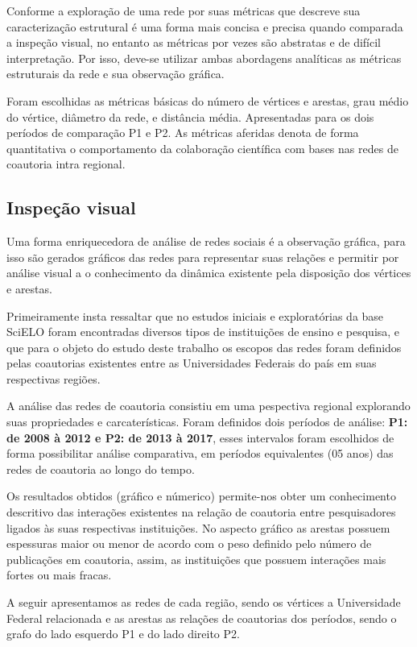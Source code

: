 \documentclass[12pt]{article}
\begin{document}
Conforme \cite{de2018exploratory} a exploração de uma rede por suas métricas que descreve sua caracterização estrutural é uma forma mais concisa e precisa quando comparada a inspeção visual, no entanto as métricas por vezes são abstratas e de difícil interpretação. Por isso, deve-se utilizar ambas abordagens analíticas as métricas estruturais da rede e sua observação gráfica.

Foram escolhidas as métricas básicas do número de vértices e arestas, grau médio do vértice, diâmetro da rede, e distância média. Apresentadas para os dois períodos de comparação P1 e P2. As métricas aferidas denota de forma quantitativa o comportamento da colaboração científica com bases nas redes de coautoria intra regional.

\subsection{Inspeção visual}

Uma forma enriquecedora de análise de redes sociais é a observação gráfica, para isso são gerados gráficos das redes para representar suas relações e permitir por análise visual a o conhecimento da dinâmica existente pela disposição dos vértices e arestas.

Primeiramente insta ressaltar que no estudos iniciais e exploratórias da base SciELO foram encontradas diversos tipos de instituições de ensino e pesquisa, e que para o objeto do estudo deste trabalho os escopos das redes foram definidos pelas coautorias existentes entre as Universidades Federais do país em suas respectivas regiões. 

A análise das redes de coautoria consistiu em uma pespectiva regional explorando suas propriedades e carcaterísticas. Foram definidos dois períodos de análise: \textbf{P1: de 2008 à 2012 e P2: de 2013 à 2017}, esses intervalos foram escolhidos de forma possibilitar análise comparativa, em períodos equivalentes (05 anos) das redes de coautoria ao longo do tempo.

Os resultados obtidos (gráfico e númerico) permite-nos obter um conhecimento descritivo das interações existentes na relação de coautoria entre pesquisadores ligados às suas respectivas instituições. No aspecto gráfico as arestas possuem espessuras maior ou menor de acordo com o peso definido pelo número de publicações em coautoria, assim, as instituições que possuem interações mais fortes ou mais fracas.

A seguir apresentamos as redes de cada região, sendo os vértices a Universidade Federal relacionada e as arestas as relações de coautorias dos períodos, sendo o grafo do lado esquerdo P1 e do lado direito P2.
\end{document}
